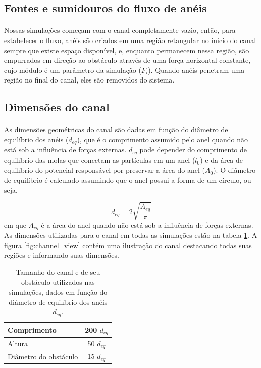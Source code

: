 \documentclass{article}
\theoremstyle{definition}
\begin{document}
\subsection{Fontes e sumidouros do fluxo de anéis}
\paragraph{}
Nossas simulações começam com o canal completamente vazio, então, para estabelecer o fluxo, anéis são criados em uma região retangular no inicio do canal sempre que existe espaço disponível, e, enquanto permanecem nessa região, são empurrados em direção ao obstáculo através de uma força horizontal constante, cujo módulo é um parâmetro da simulação ($F_i$). Quando anéis penetram uma região no final do canal, eles são removidos do sistema.

\subsection{Dimensões do canal}
\paragraph{}
As dimensões geométricas do canal são dadas em função do diâmetro de equilíbrio dos anéis ($d_{eq}$), que é o comprimento assumido pelo anel quando não está sob a influência de forças externas. $d_{eq}$ pode depender do comprimento de equilíbrio das molas que conectam as partículas em um anel ($l_0$) e da área de equilíbrio do potencial responsável por preservar a área do anel ($A_0$). O diâmetro de equilíbrio é calculado assumindo que o anel possui a forma de um círculo, ou seja,

\begin{equation}
    d_{eq} = 2\sqrt{\frac{A_{eq}}{\pi}}
    \label{eq:ring_d_eq}
\end{equation}
em que $A_{eq}$ é a área do anel quando não está sob a influência de forças externas. As dimensões utilizadas para o canal em todas as simulações estão na tabela \ref{tab:channel_dims}. A figura \ref{fig:channel_view} contém uma ilustração do canal destacando todas suas regiões e informando suas dimensões.

\begin{table}[h]
    \centering
    \begin{tabular}{|| l || c ||} 
     \hline
     Comprimento & 200 $d_{eq}$ \\
     \hline
     Altura & 50 $d_{eq}$ \\
     \hline
     Diâmetro do obstáculo & 15 $d_{eq}$ \\
     \hline
    \end{tabular}
    \caption{Tamanho do canal e de seu obstáculo utilizados nas simulações, dados em função do diâmetro de equilíbrio dos anéis $d_{eq}$.}
    \label{tab:channel_dims}
\end{table}
\end{document}
